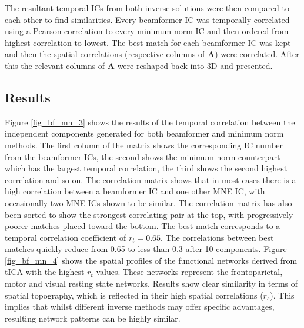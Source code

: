 The resultant temporal ICs from both inverse solutions were then compared to each other to find similarities. Every beamformer IC was temporally correlated using a Pearson correlation to every minimum norm IC and then ordered from highest correlation to lowest. The best match for each beamformer IC was kept and then the spatial correlations (respective columns of \textbf{A}) were correlated. After this the relevant columns of \textbf{A} were reshaped back into 3D and presented.   

\subsection{Results}

Figure \ref{fig_bf_mn_3} shows the results of the temporal correlation between the independent components generated for both beamformer and minimum norm methods. The first column of the matrix shows the corresponding IC number from the beamformer ICs, the second shows the minimum norm counterpart which has the largest temporal correlation, the third shows the second highest correlation and so on. The correlation matrix shows that in most cases there is a high correlation between a beamformer IC and one other MNE IC, with occasionally two MNE ICs shown to be similar. The correlation matrix has also been sorted to show the strongest correlating pair at the top, with progressively poorer matches placed toward the bottom. The best match corresponds to a temporal correlation coefficient of $r_t = 0.65$. The correlations between best matches quickly reduce from 0.65 to less than 0.3 after 10 components. Figure \ref{fig_bf_mn_4} shows the spatial profiles of the functional networks derived from tICA with the highest $r_t$ values. These networks represent the frontoparietal, motor and visual resting state networks. Results show clear similarity in terms of spatial topography, which is reflected in their high spatial correlations ($r_s$). This implies that whilst different inverse methods may offer specific advantages, resulting network patterns can be highly similar.   

